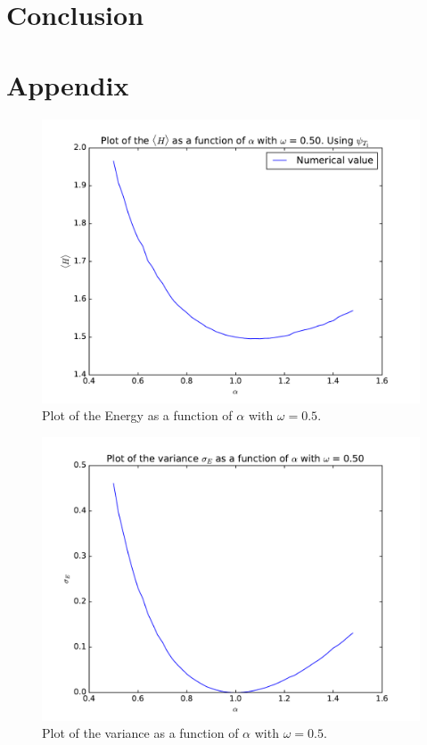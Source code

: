 \documentclass[12pt]{article}
\begin{document}
\section{Conclusion}\label{section:conclusion}

\FloatBarrier
\section{Appendix}
\begin{figure}[h]
\centering
\includegraphics[width=\linewidth]{Plots/Energy_alpha_plot_omega05.pdf}
\caption{Plot of the Energy as a function of $\alpha$ with $\omega = 0.5$.}
\label{fig:Energy_alpha_omega05}

\end{figure}
\begin{figure}[h]
\centering
\includegraphics[width=\linewidth]{Plots/Variance_alpha_plot_omega05.pdf}
\caption{Plot of the variance as a function of $\alpha$ with $\omega = 0.5$.}
\label{fig:Variance_alpha_omega05}
\end{figure}
\end{document}
